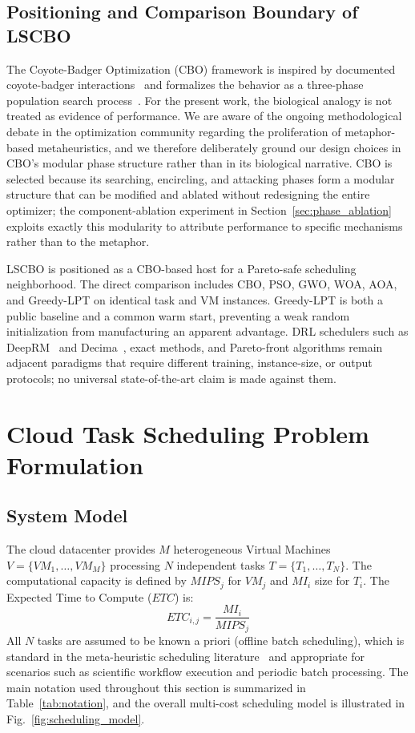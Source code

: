 \documentclass[pdflatex,onecolumn,sn-mathphys-num]{sn-jnl}
\begin{document}
\subsection{Positioning and Comparison Boundary of LSCBO}
The Coyote-Badger Optimization (CBO) framework is inspired by documented coyote-badger interactions~\cite{Kiliaan1991} and formalizes the behavior as a three-phase population search process~\cite{Khatab2025}. For the present work, the biological analogy is not treated as evidence of performance. We are aware of the ongoing methodological debate in the optimization community regarding the proliferation of metaphor-based metaheuristics, and we therefore deliberately ground our design choices in CBO's modular phase structure rather than in its biological narrative. CBO is selected because its searching, encircling, and attacking phases form a modular structure that can be modified and ablated without redesigning the entire optimizer; the component-ablation experiment in Section~\ref{sec:phase_ablation} exploits exactly this modularity to attribute performance to specific mechanisms rather than to the metaphor.

LSCBO is positioned as a CBO-based host for a Pareto-safe scheduling neighborhood. The direct comparison includes CBO, PSO, GWO, WOA, AOA, and Greedy-LPT on identical task and VM instances. Greedy-LPT is both a public baseline and a common warm start, preventing a weak random initialization from manufacturing an apparent advantage. DRL schedulers such as DeepRM~\cite{Mao2016} and Decima~\cite{Mao2019}, exact methods, and Pareto-front algorithms remain adjacent paradigms that require different training, instance-size, or output protocols; no universal state-of-the-art claim is made against them.

\section{Cloud Task Scheduling Problem Formulation}\label{sec3}

\subsection{System Model}
The cloud datacenter provides $M$ heterogeneous Virtual Machines $V = \{VM_1, \ldots, VM_M\}$ processing $N$ independent tasks $T = \{T_1, \ldots, T_N\}$. The computational capacity is defined by $MIPS_j$ for $VM_j$ and $MI_i$ size for $T_i$. The Expected Time to Compute ($ETC$) is:
\begin{equation}
ETC_{i,j} = \frac{MI_i}{MIPS_j}
\end{equation}
All $N$ tasks are assumed to be known a priori (offline batch scheduling), which is standard in the meta-heuristic scheduling literature~\cite{Braun2001} and appropriate for scenarios such as scientific workflow execution and periodic batch processing. The main notation used throughout this section is summarized in Table~\ref{tab:notation}, and the overall multi-cost scheduling model is illustrated in Fig.~\ref{fig:scheduling_model}.
\end{document}

